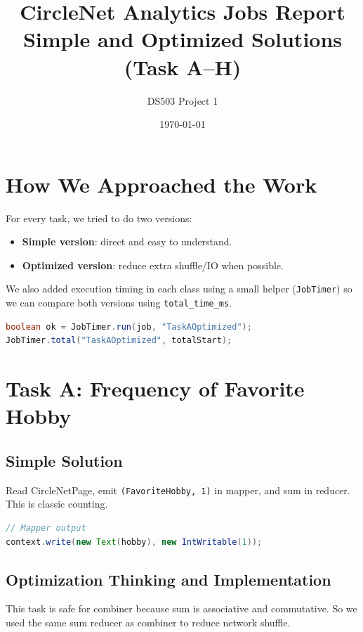 \documentclass[11pt]{article}
\title{CircleNet Analytics Jobs Report\\Simple and Optimized Solutions (Task A--H)}
\author{DS503 Project 1}
\date{\today}
\begin{document}
    \maketitle

    \section{How We Approached the Work}
    For every task, we tried to do two versions:
    \begin{itemize}
        \item \textbf{Simple version}: direct and easy to understand.
        \item \textbf{Optimized version}: reduce extra shuffle/IO when possible.
    \end{itemize}

    We also added execution timing in each class using a small helper (\texttt{JobTimer}) so we can compare both versions using \texttt{total\_time\_ms}.

    \begin{lstlisting}[style=code,language=Java,caption={Timing helper used in all jobs}]
boolean ok = JobTimer.run(job, "TaskAOptimized");
JobTimer.total("TaskAOptimized", totalStart);
    \end{lstlisting}

    \section{Task A: Frequency of Favorite Hobby}
    \subsection*{Simple Solution}
    Read CircleNetPage, emit \texttt{(FavoriteHobby, 1)} in mapper, and sum in reducer.
    This is classic counting.

    \begin{lstlisting}[style=code,language=Java]
// Mapper output
context.write(new Text(hobby), new IntWritable(1));
    \end{lstlisting}

    \subsection*{Optimization Thinking and Implementation}
    This task is safe for combiner because sum is associative and commutative.
    So we used the same sum reducer as combiner to reduce network shuffle.
\end{document}
